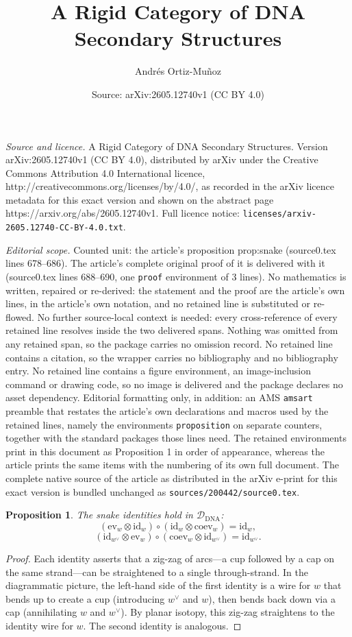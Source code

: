 \documentclass[10pt,a4paper]{amsart}
\title{A Rigid Category of DNA Secondary Structures}
\author{Andr\'es Ortiz-Mu\~noz}
\date{Source: arXiv:2605.12740v1 (CC BY 4.0)}
\newtheorem{proposition}{Proposition}
\newcommand{\Ddna}{\mathcal{D}_{\mathrm{DNA}}}
\newcommand{\coev}{\mathrm{coev}}
\newcommand{\dv}{{}^{\vee}}
\newcommand{\ev}{\mathrm{ev}}
\newcommand{\id}{\mathrm{id}}
\begin{document}
\maketitle

\noindent\emph{Source and licence.} A Rigid Category of DNA Secondary Structures. Version arXiv:2605.12740v1 (CC BY 4.0), distributed by arXiv under the Creative Commons Attribution 4.0 International licence, http://creativecommons.org/licenses/by/4.0/, as recorded in the arXiv licence metadata for this exact version and shown on the abstract page https://arxiv.org/abs/2605.12740v1. Full licence notice: \texttt{licenses/arxiv-2605.12740-CC-BY-4.0.txt}.\par\smallskip

\noindent\textit{Editorial scope.} Counted unit: the article's proposition prop:snake (source0.tex lines 678--686). The article's complete original proof of it is delivered with it (source0.tex lines 688--690, one \texttt{proof} environment of 3 lines). No mathematics is written, repaired or re-derived: the statement and the proof are the article's own lines, in the article's own notation, and no retained line is substituted or re-flowed.  No further source-local context is needed: every cross-reference of every retained line resolves inside the two delivered spans.  Nothing was omitted from any retained span, so the package carries no omission record.  No retained line contains a citation, so the wrapper carries no bibliography and no bibliography entry.  No retained line contains a figure environment, an image-inclusion command or drawing code, so no image is delivered and the package declares no asset dependency.  Editorial formatting only, in addition: an AMS \texttt{amsart} preamble that restates the article's own declarations and macros used by the retained lines, namely the environments \texttt{proposition} on separate counters, together with the standard packages those lines need.  The retained environments print in this document as Proposition 1 in order of appearance, whereas the article prints the same items with the numbering of its own full document.  The complete native source of the article as distributed in the arXiv e-print for this exact version is bundled unchanged as \texttt{sources/200442/source0.tex}.
\begin{proposition}\label{prop:snake}
The snake identities hold in $\Ddna$:
\[
(\ev_w \otimes \id_w)\circ(\id_w \otimes \coev_w) = \id_w,
\]
\[
(\id_{w\dv} \otimes \ev_w)\circ(\coev_w \otimes \id_{w\dv}) = \id_{w\dv}.
\]
\end{proposition}

\begin{proof}
Each identity asserts that a zig-zag of arcs---a cup followed by a cap on the same strand---can be straightened to a single through-strand. In the diagrammatic picture, the left-hand side of the first identity is a wire for $w$ that bends up to create a cup (introducing $w\dv$ and $w$), then bends back down via a cap (annihilating $w$ and $w\dv$). By planar isotopy, this zig-zag straightens to the identity wire for $w$. The second identity is analogous.
\end{proof}
\end{document}
